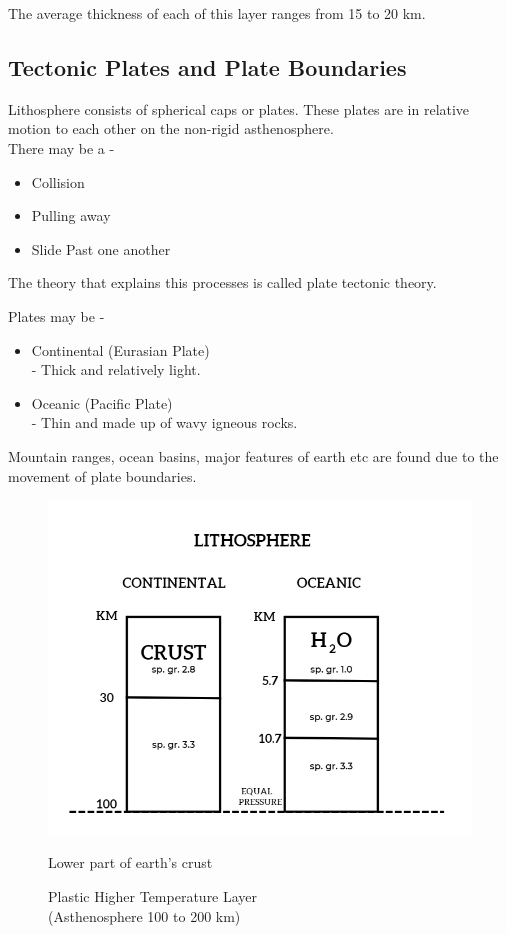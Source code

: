 \documentclass{article}
\begin{document}
\vspace*{0.5cm}
The average thickness of each of this layer ranges from 15 to 20 km. 


\subsection*{Tectonic Plates and Plate Boundaries}
Lithosphere consists of spherical caps or plates. These plates are in relative motion to each other on the non-rigid asthenosphere. \\
There may be a - 
\begin{itemize}
  \item Collision
  \item Pulling away 
  \item Slide Past one another 
\end{itemize}

The theory that explains this processes is called plate tectonic theory.

\vspace*{1cm}

Plates may be - 
\begin{itemize}
  \item Continental (Eurasian Plate) \\ - Thick and relatively light.
  \item Oceanic (Pacific Plate) \\ - Thin and made up of wavy igneous rocks.
\end{itemize}

Mountain ranges, ocean basins, major features of earth etc are found due to the movement of plate boundaries. 

\begin{figure}[H]
  \begin{center}
    \includegraphics*[width=0.7\linewidth]{img/lithospehere.png}
    \caption{Plastic Higher Temperature Layer\\ (Asthenosphere 100 to 200 km)}
    Lower part of earth's crust 
  \end{center}
\end{figure}
\end{document}
